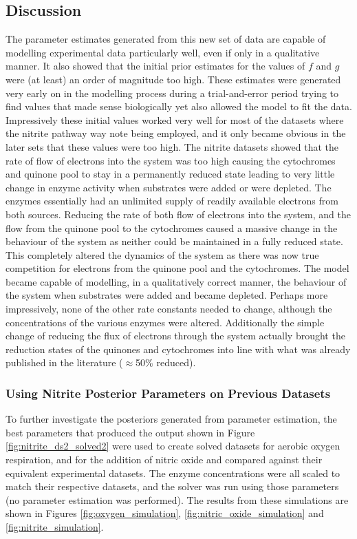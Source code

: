 \subsection{Discussion}
The parameter estimates generated from this new set of data are capable of modelling experimental data particularly well, even if only in a qualitative manner. It also showed that the initial prior estimates for the values of $f$ and $g$ were (at least) an order of magnitude too high. These estimates were generated very early on in the modelling process during a trial-and-error period trying to find values that made sense biologically yet also allowed the model to fit the data. Impressively these initial values worked very well for most of the datasets where the nitrite pathway way note being employed, and it only became obvious in the later sets that these values were too high. The nitrite datasets showed that the rate of flow of electrons into the system was too high causing the cytochromes and quinone pool to stay in a permanently reduced state leading to very little change in enzyme activity when substrates were added or were depleted. The enzymes essentially had an unlimited supply of readily available electrons from both sources. Reducing the rate of both flow of electrons into the system, and the flow from the quinone pool to the cytochromes caused a massive change in the behaviour of the system as neither could be maintained in a fully reduced state. This completely altered the dynamics of the system as there was now true competition for electrons from the quinone pool and the cytochromes. The model became capable of modelling, in a qualitatively correct manner, the behaviour of the system when substrates were added and became depleted. Perhaps more impressively, none of the other rate constants needed to change, although the concentrations of the various enzymes were altered. Additionally the simple change of reducing the flux of electrons through the system actually brought the reduction states of the quinones and cytochromes into line with what was already published in the literature ($\approx$50\% reduced)\cite{Otten1999}.

\subsubsection[Using Nitrite Posterior Parameters]{Using Nitrite Posterior Parameters on Previous Datasets}
To further investigate the posteriors generated from parameter estimation, the best parameters that produced the output shown in Figure \ref{fig:nitrite_ds2_solved2} were used to create solved datasets for aerobic oxygen respiration, and for the addition of nitric oxide and compared against their equivalent experimental datasets. The enzyme concentrations were all scaled to match their respective datasets, and the solver was run using those parameters (no parameter estimation was performed). The results from these simulations are shown in Figures \ref{fig:oxygen_simulation}, \ref{fig:nitric_oxide_simulation} and \ref{fig:nitrite_simulation}.

